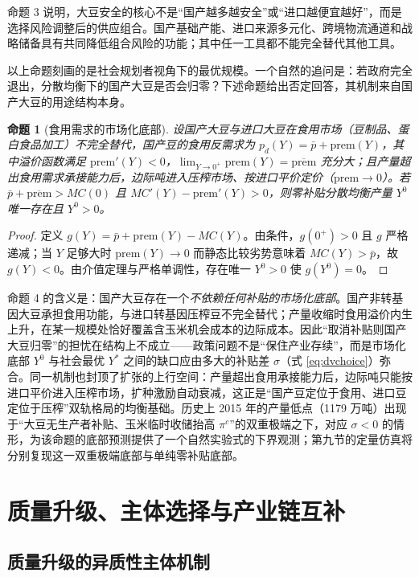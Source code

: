 \documentclass[UTF8,zihao=-4,fontset=fandol]{ctexart}
\numberwithin{equation}{section}
\newtheorem{proposition}{命题}
\theoremstyle{definition}
\theoremstyle{remark}
\begin{document}
命题 3 说明，大豆安全的核心不是“国产越多越安全”或“进口越便宜越好”，而是选择风险调整后的供应组合。国产基础产能、进口来源多元化、跨境物流通道和战略储备具有共同降低组合风险的功能；其中任一工具都不能完全替代其他工具。

以上命题刻画的是社会规划者视角下的最优规模。一个自然的追问是：若政府完全退出，分散均衡下的国产大豆是否会归零？下述命题给出否定回答，其机制来自国产大豆的用途结构本身。

\begin{proposition}[食用需求的市场化底部]
设国产大豆与进口大豆在食用市场（豆制品、蛋白食品加工）不完全替代，国产豆的食用反需求为 $p_d(Y)=\bar p+\mathrm{prem}(Y)$，其中溢价函数满足 $\mathrm{prem}'(Y)<0$，$\lim_{Y\to 0^+}\mathrm{prem}(Y)=\overline{\mathrm{prem}}$ 充分大；且产量超出食用需求承接能力后，边际吨进入压榨市场、按进口平价定价（$\mathrm{prem}\to 0$）。若 $\bar p+\overline{\mathrm{prem}}>MC(0)$ 且 $MC'(Y)-\mathrm{prem}'(Y)>0$，则零补贴分散均衡产量 $Y^{0}$ 唯一存在且 $Y^{0}>0$。
\label{prop:foodfloor}
\end{proposition}

\begin{proof}
定义 $g(Y)=\bar p+\mathrm{prem}(Y)-MC(Y)$。由条件，$g(0^+)>0$ 且 $g$ 严格递减；当 $Y$ 足够大时 $\mathrm{prem}(Y)\to0$ 而静态比较劣势意味着 $MC(Y)>\bar p$，故 $g(Y)<0$。由介值定理与严格单调性，存在唯一 $Y^0>0$ 使 $g(Y^0)=0$。\end{proof}

命题 4 的含义是：国产大豆存在一个\emph{不依赖任何补贴的市场化底部}。国产非转基因大豆承担食用功能，与进口转基因压榨豆不完全替代；产量收缩时食用溢价内生上升，在某一规模处恰好覆盖含玉米机会成本的边际成本。因此“取消补贴则国产大豆归零”的担忧在结构上不成立——政策问题不是“保住产业存续”，而是市场化底部 $Y^0$ 与社会最优 $Y^*$ 之间的缺口应由多大的补贴差 $\sigma$（式 \eqref{eq:dvchoice}）弥合。同一机制也封顶了扩张的上行空间：产量超出食用承接能力后，边际吨只能按进口平价进入压榨市场，扩种激励自动衰减，这正是“国产豆定位于食用、进口豆定位于压榨”双轨格局的均衡基础。历史上 2015 年的产量低点（1179 万吨）出现于“大豆无生产者补贴、玉米临时收储抬高 $\pi^c$”的双重极端之下，对应 $\sigma<0$ 的情形，为该命题的底部预测提供了一个自然实验式的下界观测；第九节的定量仿真将分别复现这一双重极端底部与单纯零补贴底部。

\section{质量升级、主体选择与产业链互补}

\subsection{质量升级的异质性主体机制}
\end{document}
